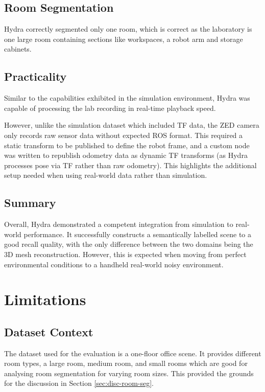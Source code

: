\subsection{Room Segmentation}\label{subsec:real-room-segmentation}
Hydra correctly segmented only one room, which is correct as the laboratory is one large room containing sections like workspaces, a robot arm and storage cabinets.

\subsection{Practicality}\label{subsec:real-practicality}
Similar to the capabilities exhibited in the simulation environment, Hydra was capable of processing the lab recording in real-time playback speed. 

However, unlike the simulation dataset which included TF data, the ZED camera only records raw sensor data without expected ROS format. This required a static transform to be published to define the robot frame, and a custom node was written to republish odometry data as dynamic TF transforms (as Hydra processes pose via TF rather than raw odometry). This highlights the additional setup needed when using real-world data rather than simulation.

\subsection{Summary}\label{subsec:real-summary}
Overall, Hydra demonstrated a competent integration from simulation to real-world performance. It successfully constructs a semantically labelled scene to a good recall quality, with the only difference between the two domains being the 3D mesh reconstruction. However, this is expected when moving from perfect environmental conditions to a handheld real-world noisy environment.

\section{Limitations}\label{sec:limitations}

\subsection{Dataset Context}\label{sec:lim:context}

The dataset used for the evaluation is a one-floor office scene. It provides different room types, a large room, medium room, and small rooms which are good for analysing room segmentation for varying room sizes. This provided the grounds for the discussion in Section \ref{sec:disc-room-seg}.

